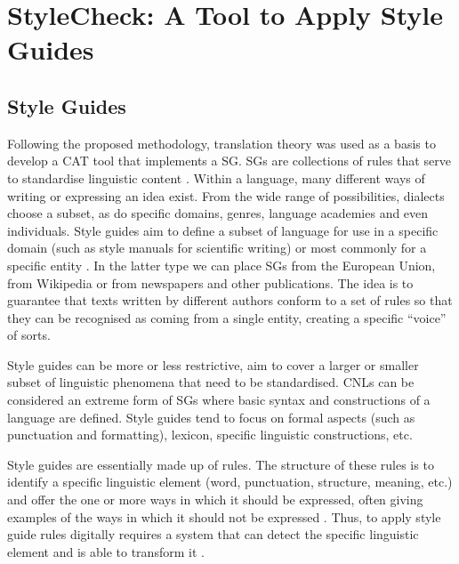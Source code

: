 
\chapter{StyleCheck: A Tool to Apply Style Guides}
\label{ch:stylecheck}


\section{Style Guides}

\noindent Following the proposed methodology, translation theory was used as a basis to develop a \ac{CAT} tool that implements a \ac{SG}. \acp{SG} are collections of rules that serve to standardise linguistic content \parencite{vidal2013guia}. Within a language, many different ways of writing or expressing an idea exist. From the wide range of possibilities, dialects choose a subset, as do specific domains, genres, language academies and even individuals. Style guides aim to define a subset of language for use in a specific domain (such as style manuals for scientific writing) or most commonly for a specific entity \parencite{vidal2013guia}. In the latter type we can place \acp{SG} from the European Union, from Wikipedia or from newspapers and other publications. The idea is to guarantee that texts written by different authors conform to a set of rules so that they can be recognised as coming from a single entity, creating a specific ``voice'' of sorts. 

Style guides can be more or less restrictive, \ie aim to cover a larger or smaller subset of linguistic phenomena that need to be standardised. \aclp{CNL} can be considered an extreme form of \acp{SG} where basic syntax and constructions of a language are defined. Style guides tend to focus on formal aspects (such as punctuation and formatting), lexicon, specific linguistic constructions, etc. 

Style guides are essentially made up of rules. The structure of these rules is to identify a specific linguistic element (word, punctuation, structure, meaning, etc.) and offer the one or more ways in which it should be expressed, often giving examples of the ways in which it should not be expressed \parencite{vidal2013guia}. Thus, to apply style guide rules digitally requires a system that can detect the specific linguistic element and is able to transform it \parencite{vidal2013guia}.

